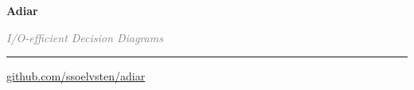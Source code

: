 \begin{frame}{} %
  \pause

  \begin{center}
    {\fontsize{42}{50}\selectfont \textbf{Adiar}}

    \textcolor{gray}{\large \em
      I/O-efficient Decision Diagrams
    }

    \vspace{-10pt}
    \rule{180pt}{0.6pt}
    \vspace{-5pt}

    \textcolor{gray}{\small
      \href{http://github.com/ssoelvsten/adiar}{github.com/ssoelvsten/adiar}
    }
  \end{center}
\end{frame}